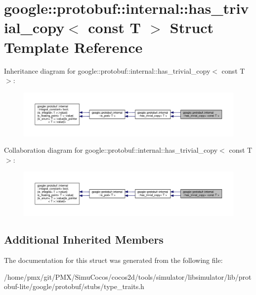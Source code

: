 \hypertarget{structgoogle_1_1protobuf_1_1internal_1_1has__trivial__copy_3_01const_01T_01_4}{}\section{google\+:\+:protobuf\+:\+:internal\+:\+:has\+\_\+trivial\+\_\+copy$<$ const T $>$ Struct Template Reference}
\label{structgoogle_1_1protobuf_1_1internal_1_1has__trivial__copy_3_01const_01T_01_4}


Inheritance diagram for google\+:\+:protobuf\+:\+:internal\+:\+:has\+\_\+trivial\+\_\+copy$<$ const T $>$\+:
\nopagebreak
\begin{figure}[H]
\begin{center}
\leavevmode
\includegraphics[width=350pt]{structgoogle_1_1protobuf_1_1internal_1_1has__trivial__copy_3_01const_01T_01_4__inherit__graph}
\end{center}
\end{figure}


Collaboration diagram for google\+:\+:protobuf\+:\+:internal\+:\+:has\+\_\+trivial\+\_\+copy$<$ const T $>$\+:
\nopagebreak
\begin{figure}[H]
\begin{center}
\leavevmode
\includegraphics[width=350pt]{structgoogle_1_1protobuf_1_1internal_1_1has__trivial__copy_3_01const_01T_01_4__coll__graph}
\end{center}
\end{figure}
\subsection*{Additional Inherited Members}


The documentation for this struct was generated from the following file\+:\begin{DoxyCompactItemize}
\item 
/home/pmx/git/\+P\+M\+X/\+Simu\+Cocos/cocos2d/tools/simulator/libsimulator/lib/protobuf-\/lite/google/protobuf/stubs/type\+\_\+traits.\+h\end{DoxyCompactItemize}
